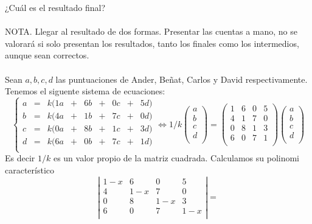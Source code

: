 \documentclass{article}
\begin{document}
¿Cuál es el resultado final?
\\\\
NOTA. Llegar al resultado de dos formas. Presentar las cuentas a mano, no se valorará si
solo presentan los resultados, tanto los finales como los intermedios, aunque sean
correctos.
\\\\
Sean $a,b,c,d$ las puntuaciones de Ander, Beñat, Carlos y David respectivamente. Tenemos el siguente sistema de ecuaciones:
$$
\left\{\begin{array}{ccccccccc}
    a & = & k(1a & + & 6b & + & 0c & + & 5d)\\
    b & = & k(4a & + & 1b & + & 7c & + & 0d)\\
    c & = & k(0a & + & 8b & + & 1c & + & 3d)\\
    d & = & k(6a & + & 0b & + & 7c & + & 1d)\\
\end{array}\right.
\Leftrightarrow
1/k
\left(\begin{array}{ccccccccc}
    a\\
    b\\
    c\\
    d\\
\end{array}\right)
=
\left(\begin{array}{ccccccccc}
    1 & 6 & 0& 5\\
    4 & 1 & 7& 0\\
    0 & 8 & 1& 3\\
    6 & 0 & 7& 1\\
\end{array}\right)
\left(\begin{array}{ccccccccc}
    a\\
    b\\
    c\\
    d\\
\end{array}\right)
$$
Es decir $1/k$ es un valor propio de la matriz cuadrada. Calculamos su polinomi característico
$$
\left|\begin{array}{ccccccccc}
    1-x & 6 & 0& 5\\
    4 & 1-x & 7& 0\\
    0 & 8 & 1-x& 3\\
    6 & 0 & 7& 1-x\\
\end{array}\right| =
$$
\end{document}
